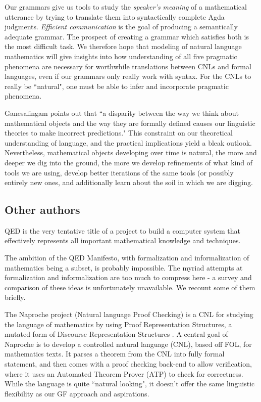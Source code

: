 Our grammars give us tools to study the \emph{speaker's meaning} of a
mathematical utterance by trying to translate them into syntactically complete
Agda judgments. \emph{Efficient communication} is the goal of producing a
semantically adequate grammar. The prospect of creating a grammar which
satisfies both is the most difficult task. We therefore hope that modeling of
natural language mathematics will give insights into how understanding of all
five pragmatic phenomena are necessary for worthwhile translations between CNLs
and formal languages, even if our grammars only really work with syntax. For the
CNLs to really be ``natural", one must be able to infer and incorporate
pragmatic phenomena.

Ganesalingam points out that ``a disparity between the way we think about
mathematical objects and the way they are formally defined causes our linguistic
theories to make incorrect predictions." This constraint on our theoretical
understanding of language, and the practical implications yield a bleak outlook.
Nevertheless, mathematical objects developing over time is natural, the more and
deeper we dig into the ground, the more we develop refinements of what kind of
tools we are using, develop better iterations of the same tools (or possibly
entirely new ones, and additionally learn about the soil in which we are
digging.

\subsection{Other authors}

\begin{displayquote}
QED is the very tentative title of a project to build a computer system that effectively represents all important mathematical knowledge and techniques.
\cite{godel1994qed} 
\end{displayquote}

The ambition of the QED Manifesto, with formalization and informalization of
mathematics being a subset, is probably impossible. The myriad attempts
at formalization and informalization are too much to compress here - a survey
and comparison of these ideas is unfortunately unavailable. We recount some of
them briefly.

The Naproche project (Natural language Proof Checking) is a CNL for studying the
language of mathematics by using Proof Representation Structures, a mutated form
of Discourse Representation Structures \cite{cramer2009naproche}. A central
goal of Naproche is to develop a controlled natural language (CNL), based off FOL, for
mathematics texts. It parses a theorem from the CNL into fully formal
statement, and then comes with a proof checking back-end to allow verification,
where it uses an Automated Theorem Prover (ATP) to check for correctness.
While the language is quite ``natural looking", it doesn't offer the same
linguistic flexibility as our GF approach and aspirations.

